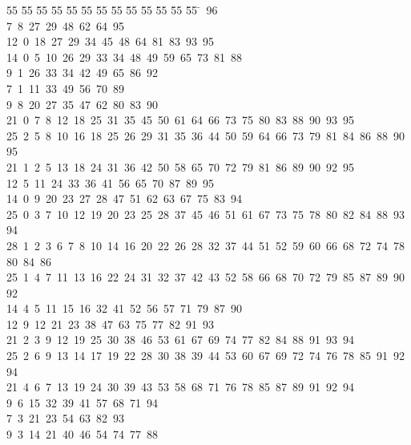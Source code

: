 %
%
\begin{tabbing}
55 \= 55 \= 55 \= 55 \= 55 \= 55 \= 55 \= 55 \= 55 \= 55 \= 55 \= 55 \= 55 \= \ 96\\[0pt]
7\ 8\ 27\ 29\ 48\ 62\ 64\ 95\\[0pt]
12\ 0\ 18\ 27\ 29\ 34\ 45\ 48\ 64\ 81\ 83\ 93\ 95\\[0pt]
14\ 0\ 5\ 10\ 26\ 29\ 33\ 34\ 48\ 49\ 59\ 65\ 73\ 81\ 88\\[0pt]
9\ 1\ 26\ 33\ 34\ 42\ 49\ 65\ 86\ 92\\[0pt]
7\ 1\ 11\ 33\ 49\ 56\ 70\ 89\\[0pt]
9\ 8\ 20\ 27\ 35\ 47\ 62\ 80\ 83\ 90\\[0pt]
21\ 0\ 7\ 8\ 12\ 18\ 25\ 31\ 35\ 45\ 50\ 61\ 64\ 66\ 73\ 75\ 80\ 83\ 88\ 90\ 93\ 95\\[0pt]
25\ 2\ 5\ 8\ 10\ 16\ 18\ 25\ 26\ 29\ 31\ 35\ 36\ 44\ 50\ 59\ 64\ 66\ 73\ 79\ 81\ 84\ 86\ 88\ 90\ 95\\[0pt]
21\ 1\ 2\ 5\ 13\ 18\ 24\ 31\ 36\ 42\ 50\ 58\ 65\ 70\ 72\ 79\ 81\ 86\ 89\ 90\ 92\ 95\\[0pt]
12\ 5\ 11\ 24\ 33\ 36\ 41\ 56\ 65\ 70\ 87\ 89\ 95\\[0pt]
14\ 0\ 9\ 20\ 23\ 27\ 28\ 47\ 51\ 62\ 63\ 67\ 75\ 83\ 94\\[0pt]
25\ 0\ 3\ 7\ 10\ 12\ 19\ 20\ 23\ 25\ 28\ 37\ 45\ 46\ 51\ 61\ 67\ 73\ 75\ 78\ 80\ 82\ 84\ 88\ 93\ 94\\[0pt]
28\ 1\ 2\ 3\ 6\ 7\ 8\ 10\ 14\ 16\ 20\ 22\ 26\ 28\ 32\ 37\ 44\ 51\ 52\ 59\ 60\ 66\ 68\ 72\ 74\ 78\ 80\ 84\ 86\\[0pt]
25\ 1\ 4\ 7\ 11\ 13\ 16\ 22\ 24\ 31\ 32\ 37\ 42\ 43\ 52\ 58\ 66\ 68\ 70\ 72\ 79\ 85\ 87\ 89\ 90\ 92\\[0pt]
14\ 4\ 5\ 11\ 15\ 16\ 32\ 41\ 52\ 56\ 57\ 71\ 79\ 87\ 90\\[0pt]
12\ 9\ 12\ 21\ 23\ 38\ 47\ 63\ 75\ 77\ 82\ 91\ 93\\[0pt]
21\ 2\ 3\ 9\ 12\ 19\ 25\ 30\ 38\ 46\ 53\ 61\ 67\ 69\ 74\ 77\ 82\ 84\ 88\ 91\ 93\ 94\\[0pt]
25\ 2\ 6\ 9\ 13\ 14\ 17\ 19\ 22\ 28\ 30\ 38\ 39\ 44\ 53\ 60\ 67\ 69\ 72\ 74\ 76\ 78\ 85\ 91\ 92\ 94\\[0pt]
21\ 4\ 6\ 7\ 13\ 19\ 24\ 30\ 39\ 43\ 53\ 58\ 68\ 71\ 76\ 78\ 85\ 87\ 89\ 91\ 92\ 94\\[0pt]
9\ 6\ 15\ 32\ 39\ 41\ 57\ 68\ 71\ 94\\[0pt]
7\ 3\ 21\ 23\ 54\ 63\ 82\ 93\\[0pt]
9\ 3\ 14\ 21\ 40\ 46\ 54\ 74\ 77\ 88\\[0pt]

\end{tabbing}
